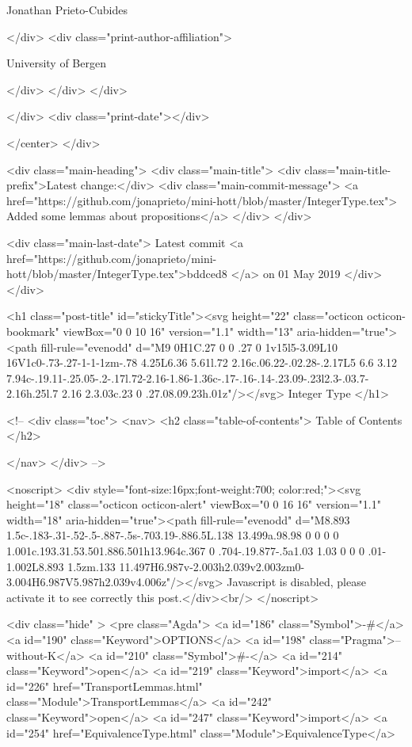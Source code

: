                   Jonathan Prieto-Cubides
                
              </div>
              <div class="print-author-affiliation">
                
                  University of Bergen
                
                </div>
            </div>
          </div>
          
          
        </div>
        <div class="print-date"></div>
        
        
    </center>
  </div>

  
  <div class="main-heading">
    <div class="main-title">
      <div class="main-title-prefix">Latest change:</div>
      <div class="main-commit-message">
            <a href="https://github.com/jonaprieto/mini-hott/blob/master/IntegerType.tex">
              Added some lemmas about propositions</a>
      </div>
    </div>

    <div class="main-last-date">
      Latest commit <a href="https://github.com/jonaprieto/mini-hott/blob/master/IntegerType.tex">bddced8 </a> on  01 May 2019
    </div>
  </div>
  
  <h1 class="post-title" id="stickyTitle"><svg height="22" class="octicon octicon-bookmark" viewBox="0 0 10 16" version="1.1" width="13" aria-hidden="true"><path fill-rule="evenodd" d="M9 0H1C.27 0 0 .27 0 1v15l5-3.09L10 16V1c0-.73-.27-1-1-1zm-.78 4.25L6.36 5.61l.72 2.16c.06.22-.02.28-.2.17L5 6.6 3.12 7.94c-.19.11-.25.05-.2-.17l.72-2.16-1.86-1.36c-.17-.16-.14-.23.09-.23l2.3-.03.7-2.16h.25l.7 2.16 2.3.03c.23 0 .27.08.09.23h.01z"/></svg> Integer Type
  </h1>

  <!-- 
  <div class="toc">
    <nav>
    <h2 class="table-of-contents"> Table of Contents </h2>
      

    </nav>
  </div>
   -->

  <noscript>
  <div style="font-size:16px;font-weight:700; color:red;"><svg height="18" class="octicon octicon-alert" viewBox="0 0 16 16" version="1.1" width="18" aria-hidden="true"><path fill-rule="evenodd" d="M8.893 1.5c-.183-.31-.52-.5-.887-.5s-.703.19-.886.5L.138 13.499a.98.98 0 0 0 0 1.001c.193.31.53.501.886.501h13.964c.367 0 .704-.19.877-.5a1.03 1.03 0 0 0 .01-1.002L8.893 1.5zm.133 11.497H6.987v-2.003h2.039v2.003zm0-3.004H6.987V5.987h2.039v4.006z"/></svg> Javascript is disabled, please activate it to see correctly this post.</div><br/>
  </noscript>

  <div class="hide" >
<pre class="Agda">
<a id="186" class="Symbol">{-#</a> <a id="190" class="Keyword">OPTIONS</a> <a id="198" class="Pragma">--without-K</a> <a id="210" class="Symbol">#-}</a>
<a id="214" class="Keyword">open</a> <a id="219" class="Keyword">import</a> <a id="226" href="TransportLemmas.html" class="Module">TransportLemmas</a>
<a id="242" class="Keyword">open</a> <a id="247" class="Keyword">import</a> <a id="254" href="EquivalenceType.html" class="Module">EquivalenceType</a>


